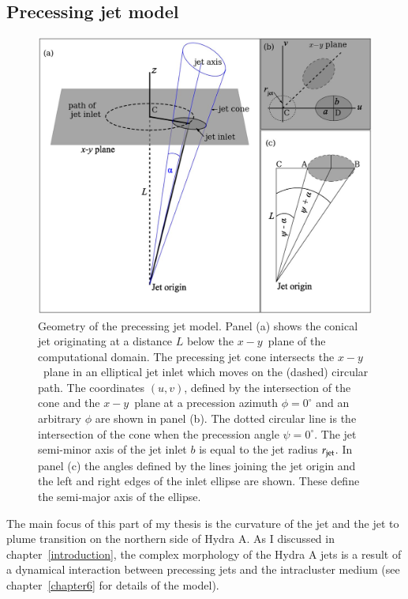 \subsection{Precessing jet model}
\begin{figure}
\centering
\includegraphics[width=\linewidth]{fig2.eps}
\caption{Geometry of the precessing jet model. Panel (a) shows  the conical jet originating at a distance $L$ below the $x-y$~plane of the computational domain. The precessing jet cone intersects the $x-y$~plane in an elliptical jet inlet which moves on the (dashed) circular path. The coordinates $(u,v)$, defined by the intersection of the cone and the $x-y$~plane at a precession azimuth $\phi = 0^{\circ}$ and an arbitrary $\phi$ are shown in panel (b). The dotted circular line is the intersection of the cone when the precession angle $\psi = 0^{\circ}$.
The jet semi-minor axis of the jet inlet $b$ is equal to the jet radius $r_{\rm jet}$.  In panel (c) the angles defined by the lines joining the jet origin and the left and right edges of the inlet ellipse are shown. These define the semi-major axis of the ellipse.}
\label{f:mod}
\end{figure}
The main focus of this part of my thesis is the curvature of the jet and the jet to plume transition on the northern side of Hydra A. As I discussed in chapter~\ref{introduction}, the complex morphology of the Hydra A jets is a result of a dynamical interaction between precessing jets and the intracluster medium (see chapter~\ref{chapter6} for details of the model).

